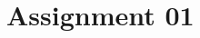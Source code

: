 \documentclass[12pt,a4paper,ngerman]{exam}
\begin{document}
\section*{Assignment 01}
\begin{questions}







\end{questions}
\end{document}
